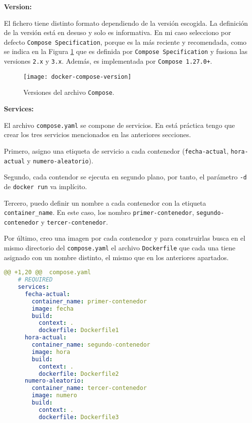\par \textbf{Version:}
\par El fichero tiene distinto formato dependiendo de la versión
escogida. La definición de la versión está en desuso y solo es informativa. En mi caso selecciono por defecto \texttt{Compose Specification}, porque es la más reciente 
y recomendada, como se indica en la Figura \ref{fig:docker-compose-version} que es definida por \texttt{Compose Specification}
y fusiona las versiones \texttt{2.x} y \texttt{3.x}. Además, es implementada por \texttt{Compose 1.27.0+}.

 \begin{figure}[H]
	\texttt{[image: docker-compose-version]}
	\centering
	\caption{Versiones del archivo \texttt{Compose}.}
    \label{fig:docker-compose-version}
\end{figure}
\newpage
\par \textbf{Services:}
\par El archivo \texttt{compose.yaml} se compone de servicios.
En está práctica tengo que crear los tres servicios mencionados en las anteriores secciones.
\par Primero, asigno una etiqueta de servicio a cada contenedor
(\texttt{fecha-actual}, \texttt{hora-actual} y \texttt{numero-aleatorio}).
\par Segundo, cada contendor se ejecuta en segundo plano, por tanto, el 
parámetro \texttt{-d} de \texttt{docker run} va implícito.
\par Tercero, puedo definir un nombre a cada contenedor con la etiqueta \texttt{container\_name}.
En este caso, los nombro \texttt{primer-contenedor}, \texttt{segundo-contenedor} y \texttt{tercer-contenedor}.
\par Por último, creo una imagen por cada contenedor y para construirlas busca en el mismo directorio del \texttt{compose.yaml}
el archivo \texttt{Dockerfile} que cada una tiene asignado con un nombre distinto, el mismo que en los anteriores apartados.
\begin{lstlisting}[language=yaml, firstnumber=0]
    @@ +1,20 @@  compose.yaml
    # REQUIRED
    services:
      fecha-actual:
        container_name: primer-contenedor
        image: fecha
        build:
          context: .
          dockerfile: Dockerfile1
      hora-actual:
        container_name: segundo-contenedor
        image: hora
        build:
          context: .
          dockerfile: Dockerfile2
      numero-aleatorio:
        container_name: tercer-contenedor
        image: numero
        build: 
          context: .
          dockerfile: Dockerfile3
\end{lstlisting}

